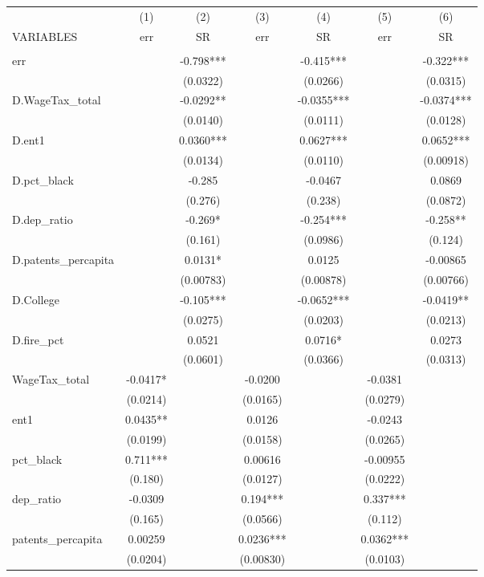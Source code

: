 \begin{tabular}{lcccccc} \hline
 & (1) & (2) & (3) & (4) & (5) & (6) \\
VARIABLES & err & SR & err & SR & err & SR \\ \hline
 &  &  &  &  &  &  \\
err &  & -0.798*** &  & -0.415*** &  & -0.322*** \\
 &  & (0.0322) &  & (0.0266) &  & (0.0315) \\
D.WageTax\_total &  & -0.0292** &  & -0.0355*** &  & -0.0374*** \\
 &  & (0.0140) &  & (0.0111) &  & (0.0128) \\
D.ent1 &  & 0.0360*** &  & 0.0627*** &  & 0.0652*** \\
 &  & (0.0134) &  & (0.0110) &  & (0.00918) \\
D.pct\_black &  & -0.285 &  & -0.0467 &  & 0.0869 \\
 &  & (0.276) &  & (0.238) &  & (0.0872) \\
D.dep\_ratio &  & -0.269* &  & -0.254*** &  & -0.258** \\
 &  & (0.161) &  & (0.0986) &  & (0.124) \\
D.patents\_percapita &  & 0.0131* &  & 0.0125 &  & -0.00865 \\
 &  & (0.00783) &  & (0.00878) &  & (0.00766) \\
D.College &  & -0.105*** &  & -0.0652*** &  & -0.0419** \\
 &  & (0.0275) &  & (0.0203) &  & (0.0213) \\
D.fire\_pct &  & 0.0521 &  & 0.0716* &  & 0.0273 \\
 &  & (0.0601) &  & (0.0366) &  & (0.0313) \\
WageTax\_total & -0.0417* &  & -0.0200 &  & -0.0381 &  \\
 & (0.0214) &  & (0.0165) &  & (0.0279) &  \\
ent1 & 0.0435** &  & 0.0126 &  & -0.0243 &  \\
 & (0.0199) &  & (0.0158) &  & (0.0265) &  \\
pct\_black & 0.711*** &  & 0.00616 &  & -0.00955 &  \\
 & (0.180) &  & (0.0127) &  & (0.0222) &  \\
dep\_ratio & -0.0309 &  & 0.194*** &  & 0.337*** &  \\
 & (0.165) &  & (0.0566) &  & (0.112) &  \\
patents\_percapita & 0.00259 &  & 0.0236*** &  & 0.0362*** &  \\
 & (0.0204) &  & (0.00830) &  & (0.0103) &  \\

\end{tabular}
